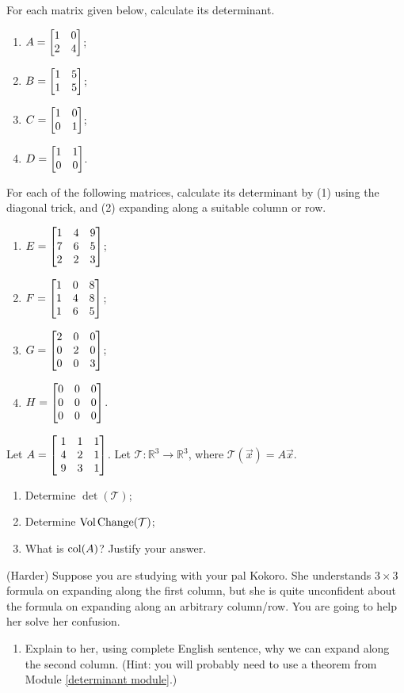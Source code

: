 \begin{exercises}
	\begin{problist}
		\prob For each matrix given below, calculate its determinant.
		\begin{enumerate}
			\item $A=\mat{1 & 0 \\ 2 & 4}$;

			\item $B=\mat{1 & 5 \\ 1 & 5}$;

			\item $C=\mat{1 & 0 \\ 0 & 1}$;

			\item $D=\mat{1 & 1 \\ 0 & 0}$.
		\end{enumerate}
		\prob For each of the following matrices, calculate its determinant by (1)
		using the diagonal trick, and (2) expanding along a suitable column or row.
		\begin{enumerate}
			\item $E=\mat{1 & 4 & 9 \\ 7 & 6 & 5 \\ 2 & 2 & 3}$;

			\item $F=\mat{1 & 0 & 8 \\ 1 & 4 & 8 \\ 1 & 6 & 5}$;

			\item $G=\mat{2 & 0 & 0 \\ 0 & 2 & 0 \\ 0 & 0 & 3}$;

			\item $H=\mat{0 & 0 & 0 \\ 0 & 0 & 0 \\ 0 & 0 & 0}$.
		\end{enumerate}
        \prob Let $A=\mat{1 & 1 & 1 \\ 4 & 2 & 1 \\\ 9 & 3 & 1}$. Let $\mathcal{T}:\mathbb{R}^3\rightarrow\mathbb{R}^3$, where $\mathcal{T}(\vec x)=A\vec x$.
        \begin{enumerate}
          \item Determine $\det(\mathcal{T})$;
          \item Determine $\operatorname{Vol\hspace{1.5pt}Change}(\mathcal{T})$;
          \item What is \(\operatorname{col}(A)\)? Justify your answer.
        \end{enumerate}
        \prob (Harder) Suppose you are studying
		with your pal Kokoro. She understands $3\times 3$ formula on expanding
		along the first column, but she is quite unconfident about the formula on
		expanding along an arbitrary column/row. You are going to help her solve
		her confusion.
		\begin{enumerate}
			\item Explain to her, using complete English sentence, why we can expand
				along the second column. (Hint: you will probably need to use a
				theorem from Module \ref{determinant module}.)


\end{enumerate}
\end{problist}
\end{exercises}
